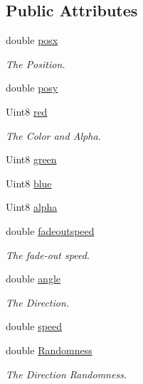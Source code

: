 \subsection*{Public Attributes}
\begin{DoxyCompactItemize}
\item 
double \hyperlink{classc_m_particle_emitter_a5d72b6783d396a4dedc82c5fa251f39c}{posx}
\begin{DoxyCompactList}\small\item\em The Position. \end{DoxyCompactList}\item 
double \hyperlink{classc_m_particle_emitter_aff5224c1f6f6cf5f1ac0cd46227c3eb2}{posy}
\item 
Uint8 \hyperlink{classc_m_particle_emitter_a8ef694bdcf4547deaba04299d20b7957}{red}
\begin{DoxyCompactList}\small\item\em The Color and Alpha. \end{DoxyCompactList}\item 
Uint8 \hyperlink{classc_m_particle_emitter_a08e621b7f89ba82db3c60d938d07df51}{green}
\item 
Uint8 \hyperlink{classc_m_particle_emitter_a7ee88308d39c49ce7cbcce4e7db47cdd}{blue}
\item 
Uint8 \hyperlink{classc_m_particle_emitter_a115d74c850d19ea4a05e40fb9ca6c585}{alpha}
\item 
double \hyperlink{classc_m_particle_emitter_ada8241a679db62be8ed1f8ec4637d484}{fadeoutspeed}
\begin{DoxyCompactList}\small\item\em The fade-\/out speed. \end{DoxyCompactList}\item 
double \hyperlink{classc_m_particle_emitter_a661137b30d54525c491df9fed851069a}{angle}
\begin{DoxyCompactList}\small\item\em The Direction. \end{DoxyCompactList}\item 
double \hyperlink{classc_m_particle_emitter_acfe8c4c88b2699b3717772c2809e4960}{speed}
\item 
double \hyperlink{classc_m_particle_emitter_af574c02b147d312f4b0dea4c6a7ff4f5}{Randomness}
\begin{DoxyCompactList}\small\item\em The Direction Randomness. \end{DoxyCompactList}\item 

\end{DoxyCompactItemize}
